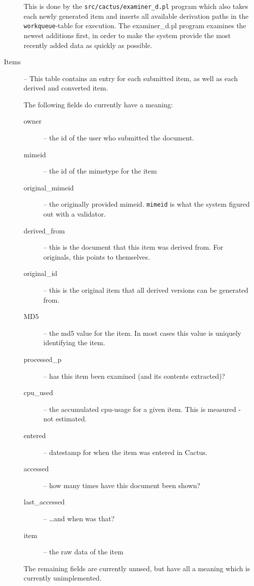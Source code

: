 \begin{description}
This is done by the \texttt{src/cactus/examiner\_d.pl} program which
also takes each newly generated item and inserts all available
derivation paths in the \texttt{workqueue}-table for execution.  The
examiner\_d.pl program examines the newest additions first, in order
to make the system provide the most recently added data as quickly as
possible.



\item[Items] -- This table contains an entry for each submitted item,
  as well as each derived and converted item.

The following fields do currently have a meaning:

\begin{description}
\item[owner] -- the id of the user who submitted the document.
\item[mimeid] -- the id of the mimetype for the item
  
\item[original\_mimeid] -- the originally provided mimeid.
  \texttt{mimeid} is what the system figured out with a validator.
  
\item[derived\_from] -- this is the document that this item was derived
  from.  For originals, this points to themselves.
\item[original\_id] -- this is the original item that all derived
  versions can be generated from.  
\item[MD5] -- the md5 value for the item.  In most cases this value is
  uniquely identifying the item.
\item[processed\_p] -- has this item been examined (and its contents
extracted)?

\item[cpu\_used] -- the accumulated cpu-usage for a given item.  This
  is measured - not estimated.

  
\item[entered] -- datestamp for when the item was entered in Cactus.

  
\item[accessed]  -- how many times have this document been shown?
\item[last\_accessed] -- \ldots and when was that?
\item[item] -- the raw data of the item
\end{description}

The remaining fields are currently unused, but have all a meaning
which is currently unimplemented.
  


\end{description}
